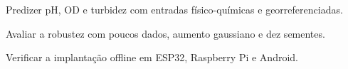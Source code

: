 \PosterBody
\begin{posteritems}
  \item Predizer pH, OD e turbidez com entradas físico-químicas e georreferenciadas.
  \item Avaliar a robustez com poucos dados, aumento gaussiano e dez sementes.
  \item Verificar a implantação offline em ESP32, Raspberry Pi e Android.
\end{posteritems}
